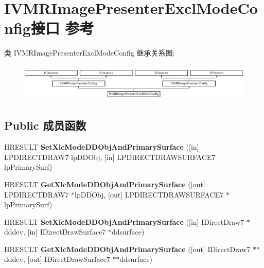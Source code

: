 \hypertarget{interface_i_v_m_r_image_presenter_excl_mode_config}{}\section{I\+V\+M\+R\+Image\+Presenter\+Excl\+Mode\+Config接口 参考}
\label{interface_i_v_m_r_image_presenter_excl_mode_config}
类 I\+V\+M\+R\+Image\+Presenter\+Excl\+Mode\+Config 继承关系图\+:\begin{figure}[H]
\begin{center}
\leavevmode
\includegraphics[height=1.810345cm]{interface_i_v_m_r_image_presenter_excl_mode_config}
\end{center}
\end{figure}
\subsection*{Public 成员函数}
\begin{DoxyCompactItemize}
\item 
\mbox{\label{interface_i_v_m_r_image_presenter_excl_mode_config_a24c23d293dfbd2a055ef8e9242ef8b2e}} 
H\+R\+E\+S\+U\+LT {\bfseries Set\+Xlc\+Mode\+D\+D\+Obj\+And\+Primary\+Surface} (\mbox{[}in\mbox{]} L\+P\+D\+I\+R\+E\+C\+T\+D\+R\+A\+W7 lp\+D\+D\+Obj, \mbox{[}in\mbox{]} L\+P\+D\+I\+R\+E\+C\+T\+D\+R\+A\+W\+S\+U\+R\+F\+A\+C\+E7 lp\+Primary\+Surf)
\item 
\mbox{\label{interface_i_v_m_r_image_presenter_excl_mode_config_a1c5a33adf72ce22bd7f51960dfc7e279}} 
H\+R\+E\+S\+U\+LT {\bfseries Get\+Xlc\+Mode\+D\+D\+Obj\+And\+Primary\+Surface} (\mbox{[}out\mbox{]} L\+P\+D\+I\+R\+E\+C\+T\+D\+R\+A\+W7 $\ast$lp\+D\+D\+Obj, \mbox{[}out\mbox{]} L\+P\+D\+I\+R\+E\+C\+T\+D\+R\+A\+W\+S\+U\+R\+F\+A\+C\+E7 $\ast$lp\+Primary\+Surf)
\item 
\mbox{\label{interface_i_v_m_r_image_presenter_excl_mode_config_a85add5d920f6a548def6f9a56cac4a9e}} 
H\+R\+E\+S\+U\+LT {\bfseries Set\+Xlc\+Mode\+D\+D\+Obj\+And\+Primary\+Surface} (\mbox{[}in\mbox{]} I\+Direct\+Draw7 $\ast$dddev, \mbox{[}in\mbox{]} I\+Direct\+Draw\+Surface7 $\ast$ddsurface)
\item 
\mbox{\label{interface_i_v_m_r_image_presenter_excl_mode_config_a1b72531008a1fb29689d2ae7b5238173}} 
H\+R\+E\+S\+U\+LT {\bfseries Get\+Xlc\+Mode\+D\+D\+Obj\+And\+Primary\+Surface} (\mbox{[}out\mbox{]} I\+Direct\+Draw7 $\ast$$\ast$dddev, \mbox{[}out\mbox{]} I\+Direct\+Draw\+Surface7 $\ast$$\ast$ddsurface)
\end{DoxyCompactItemize}
